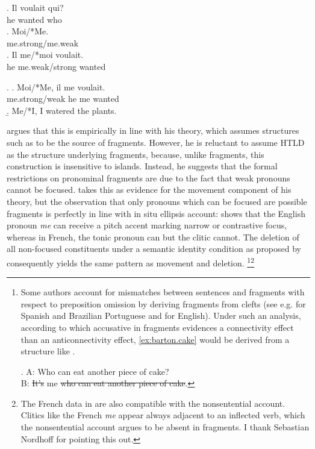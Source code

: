 \exg. Il voulait qui?\\
he wanted who\\
\hfill {}
\ag. Moi/*Me.\\
me.strong/me.weak\\
\bg. Il me/*moi voulait.\\  
he me.weak/strong wanted\\

\ex. \ag. Moi/*Me, il me voulait.\\
me.strong/weak he me wanted\\
\hfill {}
\b. Me/*I, I watered the plants. \hfill \citep[703]{merchant2004}

\citeauthor{merchant2004} argues that this is empirically in line with his theory, which assumes structures such as \Last to be the source of fragments. However, he is reluctant to assume HTLD as the structure underlying fragments, because, unlike fragments, this construction is insensitive to islands. Instead, he suggests that the formal restrictions on pronominal fragments are due to the fact that weak pronouns cannot be focused. \citet{merchant2004} takes this as evidence for the movement component of his theory, but the observation that only pronouns which can be focused are possible fragments is perfectly in line with  in situ ellipsis account: \Next[a] shows that the English pronoun \textit{me} can receive a pitch accent marking narrow or contrastive focus, whereas in French, the tonic pronoun \Next[b] can but the clitic \Next[c] cannot. The deletion of all non-focused constituents under a semantic identity condition as proposed by \citet{reich2007} consequently yields the same pattern as movement and deletion.\largerpage%
%
\footnote{Some authors account for mismatches between sentences and fragments with respect to preposition omission by deriving fragments from clefts (see e.g. \citet{rodrigues.etal2009} for Spanish and Brazilian Portuguese and \citet{vancraenenbroeck2010} for English). Under such an analysis, according to which accusative in fragments evidences a connectivity effect than an anticonnectivity effect, \ref{ex:barton.cake} would be derived from a structure like \Next.

\ex. A: Who can eat another piece of cake?\\
     B: \sout{It's} me \sout{who can eat another piece of cake}.

}\footnote{The French data in \TextNext are also compatible with the nonsentential account. Clitics like the French \textit{me} appear always adjacent to an inflected verb, which the nonsentential account argues to be absent in fragments. I thank Sebastian Nordhoff for pointing this out.}\afterfn%


